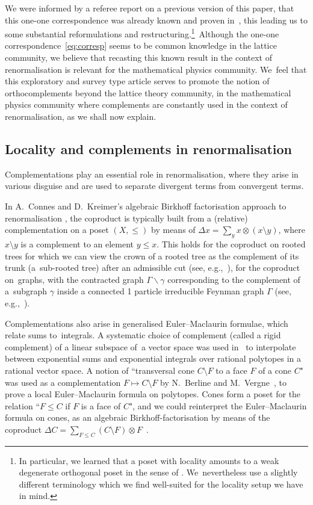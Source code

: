 \documentclass[pdftex]{sigma}
\numberwithin{equation}{section}
\begin{document}
We were informed by a referee report on a previous version of this paper, that this one-one correspondence was already known and proven in~\cite{CM}, this leading us to some substantial reformulations and restructuring.\footnote{In particular, we learned that a poset with locality amounts to a weak degenerate orthogonal poset in the sense of \cite[Definition 2.1]{CM}. We~nevertheless use a slightly different terminology which we find well-suited for the locality setup we have in mind.}\ Although the one-one correspondence~\eqref{eq:corresp} seems to be common knowledge in the lattice community, we believe that recasting this known result in the context of renormalisation is relevant for the mathematical physics community. We~feel that this explo\-ratory and survey type article serves to promote the notion of orthocomplements beyond the lattice theory community, in the mathematical physics community where complements are constantly used in the context of renormalisation, as we shall now explain.


\subsection{ Locality and complements in renormalisation}

Complementations play an essential role in renormalisation, where they arise in various disguise and are used to separate divergent terms from convergent terms.

{\samepage
In A.~Connes and D.~Kreimer's algebraic Birkhoff factorisation approach to renormalisation
\cite{CK,M}, the coproduct is typically built from a (relative) complementation on a poset $(X, \leq)$ by means of
$\Delta x=\sum_{y} x \otimes (x\setminus y)$, where $ x\setminus y$ is a complement to an element $y\leq x$. This holds for the coproduct on rooted trees for which we can view the crown of
a rooted tree as the complement of its trunk (a~sub-rooted tree) after an admissible cut (see, e.g.,~\cite{F1,F2}), for the coproduct on~graphs, with the contracted graph $\Gamma\backslash \gamma$ corresponding to
the complement of a~subgraph $\gamma$ inside a connected 1 particle irreducible Feynman graph $\Gamma$ (see, e.g.,~\cite{M}).

}

Complementations also arise in generalised Euler--Maclaurin formulae, which relate
sums to~integrals. A systematic choice of complement (called a rigid complement) of a linear subspace of~a vector space was used in~\cite{GP} to interpolate between exponential sums and
exponential integrals over rational polytopes in a rational vector space. A notion of ``transversal cone $ C\setminus F$ to a face $F$ of a cone $C$" was used as a complementation $F\mapsto C\setminus F$ by N.~Berline and M.~Vergne~\cite{BV}, to prove a local Euler--Maclaurin formula on polytopes. Cones form a poset for the relation ``$F\leq C$ if $F$ is a face of $C$", and we could reinterpret the Euler--Maclaurin formula on cones, as an algebraic Birkhoff-factorisation by means of the coproduct $\Delta C=\sum_{F\leq C} (C\setminus F)\otimes F$~\cite{GPZ1}.
\end{document}

